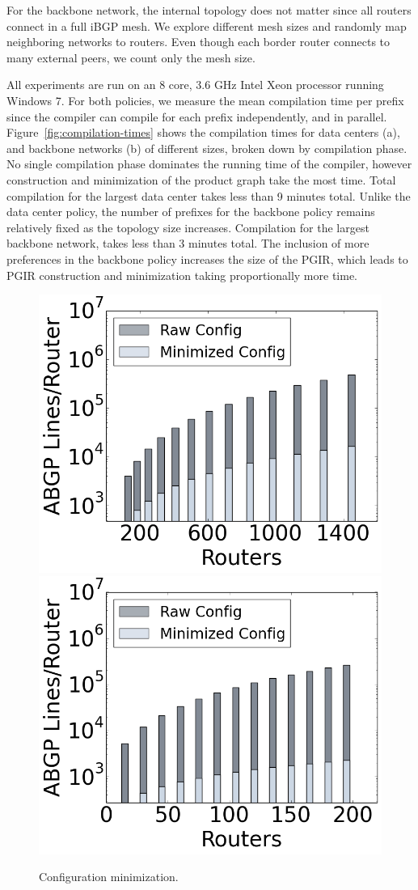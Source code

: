 For the backbone network, the internal topology does not matter since all routers connect in a full iBGP mesh. We explore different mesh sizes and randomly map neighboring networks to routers. Even though each border router connects to many external peers, we count only the mesh size.

All experiments are run on an 8 core, 3.6 GHz Intel Xeon processor running Windows 7.
%
For both policies, we measure the mean compilation time per prefix since the \sysname compiler can compile for each prefix independently, and in parallel. Figure~\ref{fig:compilation-times} shows the compilation times for data centers (a), and backbone networks (b) of different sizes, broken down by compilation phase. No single compilation phase dominates the running time of the compiler, however construction and minimization of the product graph take the most time. Total compilation for the largest data center takes less than 9 minutes total. Unlike the data center policy, the number of prefixes for the backbone policy remains relatively fixed as the topology size increases. Compilation for the largest backbone network, takes less than 3 minutes total. The inclusion of more preferences in the backbone policy increases the size of the PGIR, which leads to PGIR construction and minimization taking proportionally more time.

\begin{figure}
    {\includegraphics[width=.49\columnwidth]{figures/config-compression-dc.png}}
    {\includegraphics[width=.49\columnwidth]{figures/config-compression-backbone.png}} \\
  \label{fig:config-min}
  \caption{Configuration minimization.}
\end{figure}

